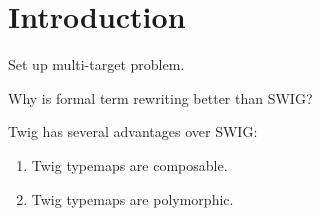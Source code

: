 
\section{Introduction}

Set up multi-target problem.

Why is formal term rewriting better than SWIG?

Twig has several advantages over SWIG:

\begin{enumerate}
\item Twig typemaps are composable.
\item Twig typemaps are polymorphic.
\end{enumerate}
